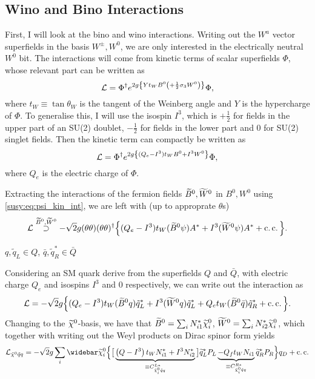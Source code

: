 \documentclass[../main.tex]{subfiles}
\begin{document}
\begin{donotread}
  \subsection{Wino and Bino Interactions}
  First, I will look at the bino and wino interactions. Writing out the \(W^a\)
  vector superfields in the basis \(W^\pm, W^0\), we are only interested in the
  electrically neutral \(W^0\) bit. The interactions will come from kinetic terms
  of scalar superfields \(\Phi\), whose relevant part can be written as
  \begin{equation}
    \L = \Phi^\dagger \exp{2g\cclosed{Y t_W B^0 \pclosed{+ \frac{1}{2}\sigma_3 W^0}}} \Phi,
  \end{equation}
  where \(t_W \equiv \tan\theta_W\) is the tangent of the Weinberg angle and \(Y\) is the hypercharge of \(\Phi\).
  To generalise this, I will use the isospin \(I^3\), which is \(+\frac{1}{2}\) for fields in the upper part of an SU(2) doublet, \(-\frac{1}{2}\) for fields in the lower part and 0 for SU(2) singlet fields.
  Then the kinetic term can compactly be written as
  \begin{equation}
    \L = \Phi^\dagger \exp{2g\cclosed{(Q_e - I^3) t_W B^0 + I^3 W^0}} \Phi,
  \end{equation}
  where \(Q_e\) is the electric charge of \(\Phi\).
  \medskip

  Extracting the interactions of the fermion fields \(\bino, \wino\) in \(B^0,
  W^0\) using \cref{susy:eq:psi_kin_int}, we are left with (up to approprate
  \(\theta\)s)
  \begin{equation}
    \L \stackrel{\bino, \wino}{\supset} -\sqrt{2}g (\theta\theta)(\theta\theta)^\dagger \Big\{ (Q_e - I^3)t_W (\bino \psi) A^\ast + I^3 (\wino \psi) A^\ast + \cc \Big\}.
  \end{equation}

  \begin{temporary}
    \(q, \tilde{q}_L \in Q\), \(\bar{q}, \tilde{q}_R^\ast \in \bar{Q}\)
  \end{temporary}

  Considering an SM quark derive from the superfields \(Q\) and \(\bar{Q}\), with
  electric charge \(Q_e\) and isospins \(I^3\) and 0 respectively, we can write
  out the interaction as
  \begin{equation}
    \L = -\sqrt{2}g \Big\{ (Q_e - I^3)t_W (\bino q) \tilde{q}_L^\ast + I^3 (\wino q) \tilde{q}_L^\ast + Q_e t_W (\bino \bar{q}) \tilde{q}_R^\ast + \cc \Big\}.
  \end{equation}
  Changing to the \(\nino\)-basis, we have that \(\bino = \sum_i N_{i1}^\ast \nino[i]\), \(\wino = \sum_i N_{i2}^\ast \nino[i]\), which together with writing out the Weyl products on Dirac spinor form yields
  \begin{equation}
    \label{susy:eq:nino_sf_f_int}
    \L_{\tilde{\chi}^0 \tilde{q}q} = -\sqrt{2} g \sum_{i} \barnino[i] \Big\{ \big[ \underbrace{\pclosed{Q - I^3}t_W N_{i1}^\ast  + I^3 N_{i2}^\ast}_{\equiv C_{\tilde{\chi}^0_i \tilde{q} q}^{L\ast}} \big] \wtilde{q}_L^\ast P_L \underbrace{- Q_f t_W N_{i1}}_{\equiv C_{\tilde{\chi}^0_i \tilde{q} q}^{R\ast}} \wtilde{q}_R^\ast P_R \Big\} q_D + \cc
  \end{equation}


\end{donotread}
\end{document}
